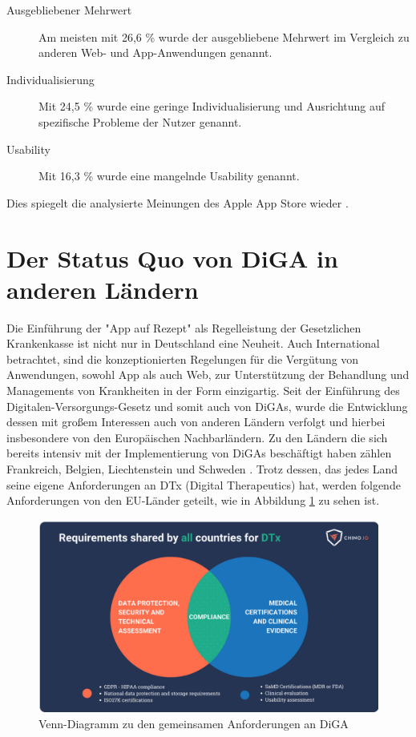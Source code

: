 \documentclass{article}
\begin{document}
			\begin{description}
				\item[Ausgebliebener Mehrwert] Am meisten mit 26,6 \% wurde der ausgebliebene Mehrwert im Vergleich zu anderen Web- und App-Anwendungen genannt.
				\item[Individualisierung] Mit 24,5 \% wurde eine geringe Individualisierung und Ausrichtung auf spezifische Probleme der Nutzer genannt.
				\item[Usability] Mit 16,3 \% wurde eine mangelnde Usability genannt.    
			\end{description}
			Dies spiegelt die analysierte Meinungen des Apple App Store wieder \cite{frauenhofinstitut}.                 
	\section{Der Status Quo von DiGA in anderen Ländern}
		Die Einführung der "App auf Rezept" als Regelleistung der Gesetzlichen Krankenkasse ist nicht nur in Deutschland eine Neuheit. Auch International betrachtet, sind die konzeptionierten Regelungen für die Vergütung von Anwendungen, sowohl App als auch Web, zur Unterstützung der Behandlung und Managements von Krankheiten in der Form einzigartig. Seit der Einführung des Digitalen-Versorgungs-Gesetz und somit auch von DiGAs, wurde die Entwicklung dessen mit großem Interessen auch von anderen Ländern verfolgt und hierbei insbesondere von den Europäischen Nachbarländern. Zu den Ländern die sich bereits intensiv mit der Implementierung von DiGAs beschäftigt haben zählen Frankreich, Belgien, Liechtenstein und Schweden \cite[vgl. S.25-26]{TK-diga-report-1}. Trotz dessen, das jedes Land seine eigene Anforderungen an DTx (Digital Therapeutics) hat, werden folgende Anforderungen von den EU-Länder geteilt, wie in Abbildung \ref{Abb-venn-diagramm} zu sehen ist. 
		\begin{figure}
			\centering
			\includegraphics[width=\textwidth]{./grafiken/venn_diagramm_anforderungen}
			\caption[Abbildung zu geteilten Anforderungen]{Venn-Diagramm zu den gemeinsamen Anforderungen an DiGA}
			\label{Abb-venn-diagramm}
		\end{figure}
\end{document}
